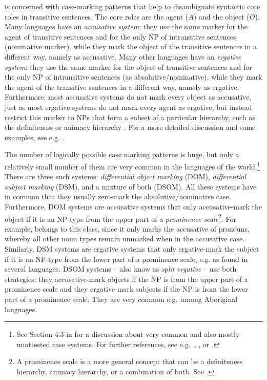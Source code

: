 \documentclass[output=paper,hidelinks]{langscibook}
\begin{document}
\citet{Jaeger07} is concerned with case-marking patterns that help to disambiguate syntactic core roles in transitive sentences. The core roles are the agent ($A$) and the object ($O$). Many languages have an \emph{accusative system}: they use the same marker for the agent of transitive sentences and for the only NP of intransitive sentences (nominative marker), while they mark the object of the transitive sentences in a different way, namely as accusative. Many other languages have an \emph{ergative system}: they use the same marker for the object of transitive sentences and for the only NP of intransitive sentences (as absolutive/nominative), while they mark the agent of the transitive sentences in a different way, namely as ergative. Furthermore, most accusative systems do not mark every object as accusative, just as most ergative systems do not mark every agent as ergative, but instead restrict this marker to NPs that form a subset of a particular hierarchy, such as the definiteness or animacy hierarchy \citep[cf.][]{Silverstein1976,Bossong1985}. For a more detailed discussion and some examples, see e.g. \citep[75--77]{Jaeger07}.

The number of logically possible case marking patterns is huge, but only a relatively small number of them are very common in the languages of the world.\footnote{See Section 4.3 in \citet{Jaeger07} for a discussion about very common and also mostly unattested case systems. For further references, see e.g.~\citet{Bossong1985}, \citet{Dixon1994}, or \citet{Blake2001}.} There are three such systems: \emph{differential object marking} (DOM), \emph{differential subject marking} (DSM), and a mixture of both (DSOM). All these systems have in common that they usually zero-mark the absolutive/nominative case. Furthermore, DOM systems are accusative systems that only accusative-mark the object if it is an NP-type from the upper part of a \emph{prominence scale}\footnote{A prominence scale is a more general concept that can be a definiteness hierarchy, animacy hierarchy, or a combination of both. See \citet[76--77]{Jaeger07}.}. For example,  belongs to this class, since it only marks the accusative of pronouns, whereby all other noun types remain unmarked when in the accusative case.
Similarly,  DSM systems are ergative systems that only ergative-mark the subject if it is an NP-type from the lower part of a prominence scale, e.g. as found in several  languages. DSOM systems -- also know as \emph{split ergative} -- use both strategies: they accusative-mark objects if the NP is from the upper part of a prominence scale and they ergative-mark subjects if the NP is from the lower part of a prominence scale. They are very common e.g.~among  Aboriginal languages.
\end{document}
